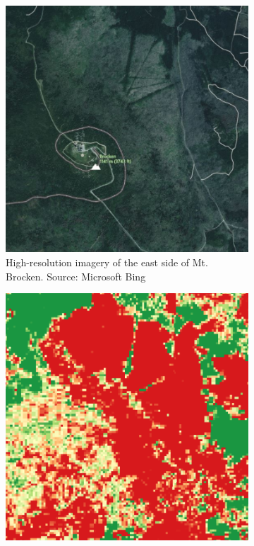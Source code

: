         \begin{figure}[H]
        \centering
        \begin{subfigure}[t]{0.24\textwidth}
        \centering
        \includegraphics[width=\linewidth,height=\linewidth]{figs_06/brocken_bing.png}
        \caption{High-resolution imagery of the east side of Mt. Brocken. Source: Microsoft Bing}
        \end{subfigure}
        \hfill
        \begin{subfigure}[t]{0.24\textwidth}
        \centering
        \includegraphics[width=\linewidth,height=\linewidth]{figs_06/brocken_ndvi_slope.png}

\end{subfigure}
\end{figure}
